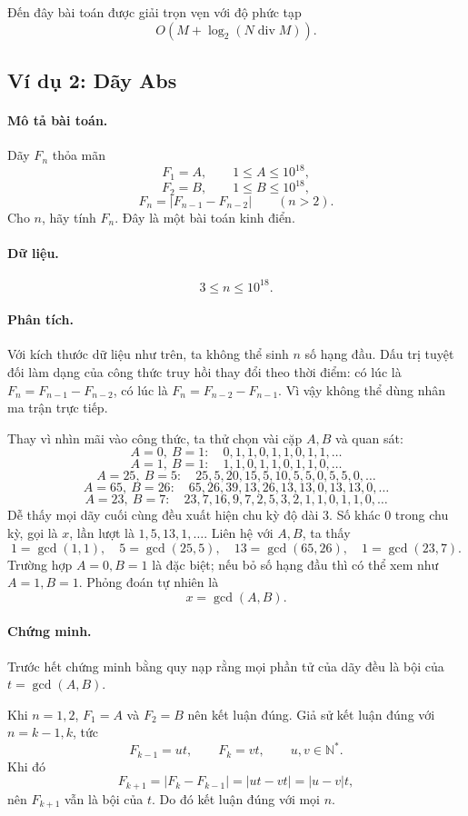 \documentclass[11pt]{article}
\begin{document}
Đến đây bài toán được giải trọn vẹn với độ phức tạp
\[
  O(M+\log_2(N\operatorname{div}M)).
\]

\subsection{Ví dụ 2: Dãy Abs}

\paragraph{Mô tả bài toán.}
Dãy $F_n$ thỏa mãn
\[
  F_1=A,\qquad 1\le A\le 10^{18},
\]
\[
  F_2=B,\qquad 1\le B\le 10^{18},
\]
\[
  F_n=|F_{n-1}-F_{n-2}|\qquad(n>2).
\]
Cho $n$, hãy tính $F_n$. Đây là một bài toán kinh điển.

\paragraph{Dữ liệu.}
\[
  3\le n\le 10^{18}.
\]

\paragraph{Phân tích.}
Với kích thước dữ liệu như trên, ta không thể sinh $n$ số hạng đầu. Dấu trị
tuyệt đối làm dạng của công thức truy hồi thay đổi theo thời điểm: có lúc là
$F_n=F_{n-1}-F_{n-2}$, có lúc là $F_n=F_{n-2}-F_{n-1}$. Vì vậy không thể dùng
nhân ma trận trực tiếp.

Thay vì nhìn mãi vào công thức, ta thử chọn vài cặp $A,B$ và quan sát:
\[
  A=0,\ B=1:\quad 0,1,1,0,1,1,0,1,1,\ldots
\]
\[
  A=1,\ B=1:\quad 1,1,0,1,1,0,1,1,0,\ldots
\]
\[
  A=25,\ B=5:\quad 25,5,20,15,5,10,5,5,0,5,5,0,\ldots
\]
\[
  A=65,\ B=26:\quad 65,26,39,13,26,13,13,0,13,13,0,\ldots
\]
\[
  A=23,\ B=7:\quad 23,7,16,9,7,2,5,3,2,1,1,0,1,1,0,\ldots
\]
Dễ thấy mọi dãy cuối cùng đều xuất hiện chu kỳ độ dài $3$. Số khác $0$ trong
chu kỳ, gọi là $x$, lần lượt là $1,5,13,1,\ldots$. Liên hệ với $A,B$, ta thấy
\[
  1=\gcd(1,1),\quad 5=\gcd(25,5),\quad
  13=\gcd(65,26),\quad 1=\gcd(23,7).
\]
Trường hợp $A=0,B=1$ là đặc biệt; nếu bỏ số hạng đầu thì có thể xem như
$A=1,B=1$. Phỏng đoán tự nhiên là
\[
  x=\gcd(A,B).
\]

\paragraph{Chứng minh.}
Trước hết chứng minh bằng quy nạp rằng mọi phần tử của dãy đều là bội của
$t=\gcd(A,B)$.

Khi $n=1,2$, $F_1=A$ và $F_2=B$ nên kết luận đúng. Giả sử kết luận đúng với
$n=k-1,k$, tức
\[
  F_{k-1}=ut,\qquad F_k=vt,\qquad u,v\in\mathbb{N}^{*}.
\]
Khi đó
\[
  F_{k+1}=|F_k-F_{k-1}|=|ut-vt|=|u-v|t,
\]
nên $F_{k+1}$ vẫn là bội của $t$. Do đó kết luận đúng với mọi $n$.
\end{document}
